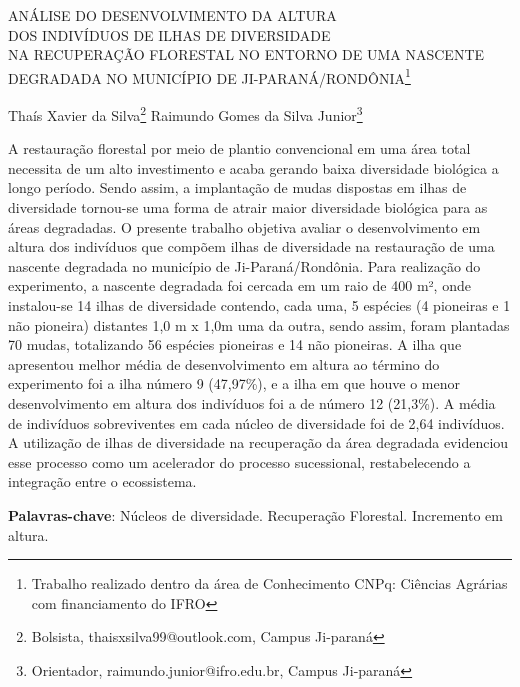 \documentclass[article,12pt,onesidea,4paper,english,brazil]{abntex2}
\begin{document}
	
	
	\frenchspacing 
	
	\begin{center}
		\LARGE ANÁLISE DO DESENVOLVIMENTO DA ALTURA\\DOS INDIVÍDUOS DE ILHAS DE DIVERSIDADE\\NA RECUPERAÇÃO FLORESTAL NO ENTORNO DE UMA NASCENTE DEGRADADA NO MUNICÍPIO DE JI-PARANÁ/RONDÔNIA\footnote{Trabalho realizado dentro da área de Conhecimento CNPq: Ciências Agrárias com financiamento do IFRO}
		
		\normalsize
	Thaís Xavier da Silva\footnote{Bolsista, thaisxsilva99@outlook.com, Campus Ji-paraná} 
		Raimundo Gomes da Silva Junior\footnote{Orientador, raimundo.junior@ifro.edu.br, Campus Ji-paraná} 
	 
	\end{center}
	
	\noindent A restauração florestal por meio de plantio convencional em uma área total necessita de um alto investimento e acaba gerando baixa diversidade biológica a longo período. Sendo assim, a implantação de mudas dispostas em ilhas de diversidade tornou-se uma forma de atrair maior diversidade biológica para as áreas degradadas. O presente trabalho objetiva avaliar o desenvolvimento em altura dos indivíduos que compõem ilhas de diversidade na restauração de uma nascente degradada no município de Ji-Paraná/Rondônia. Para realização do experimento, a nascente degradada foi cercada em um raio de 400 m², onde instalou-se 14 ilhas de diversidade contendo, cada uma, 5 espécies (4 pioneiras e 1 não pioneira) distantes 1,0 m x 1,0m uma da outra, sendo assim, foram plantadas 70 mudas, totalizando 56 espécies pioneiras e 14 não pioneiras. A ilha que apresentou melhor média de desenvolvimento em altura ao término do experimento foi a ilha número 9 (47,97\%), e a ilha em que houve o menor desenvolvimento em altura dos indivíduos foi a de número 12 (21,3\%). A média de indivíduos sobreviventes em cada núcleo de diversidade foi de 2,64 indivíduos. A utilização de ilhas de diversidade na recuperação da área degradada evidenciou esse processo como um acelerador do processo sucessional, restabelecendo a integração entre o ecossistema.
	
	\vspace{\onelineskip}
	
	\noindent
	\textbf{Palavras-chave}: Núcleos de diversidade. Recuperação Florestal. Incremento em altura.
\end{document}
